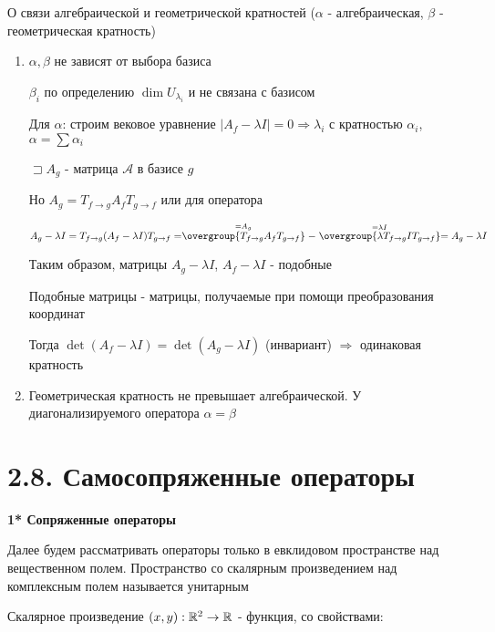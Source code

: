 \documentclass[12pt]{article}
\begin{document}
    \Nota О связи алгебраической и геометрической кратностей ($\alpha$ - алгебраическая, $\beta$ - геометрическая кратность)

    \begin{enumerate}
        \item $\alpha, \beta$ не зависят от выбора базиса

        \begin{MyProof}
            $\beta_i$ по определению $\dim U_{\lambda_i}$ и не связана с базисом

            Для $\alpha$: строим вековое уравнение $|A_f - \lambda I| = 0 \Longrightarrow \lambda_i$ с кратностью $\alpha_i$, $\alpha = \sum \alpha_i$

            $\sqsupset A_g$ - матрица $\mathcal{A}$ в базисе $g$

            Но $A_g = T_{f\to g} A_f T_{g\to f}$ или для оператора

            $A_g - \lambda I = T_{f\to g} (A_f - \lambda I) T_{g\to f} =
            \stackrel{= A_g}{\overgroup{T_{f\to g} A_f T_{g\to f}}} - \stackrel{= \lambda I}{\overgroup{\lambda T_{f\to g} I T_{g\to f}}} =
            A_g - \lambda I$

            Таким образом, матрицы $A_g - \lambda I$, $A_f - \lambda I$ - подобные

            \Def Подобные матрицы - матрицы, получаемые при помощи преобразования координат

            Тогда $\det (A_f - \lambda I) = \det (A_g - \lambda I)$ (инвариант) $\Longrightarrow$ одинаковая кратность

        \end{MyProof}

        \item Геометрическая кратность не превышает алгебраической. У диагонализируемого оператора $\alpha = \beta$
    \end{enumerate}

    \section[p2\_8]{2.8. Самосопряженные операторы}

    \textbf{1* Сопряженные операторы}

    Далее будем рассматривать операторы только в евклидовом пространстве над вещественном полем.
    Пространство со скалярным произведением над комплексным полем называется унитарным

    \Mem Скалярное произведение $(x, y) : \mathbb{R}^2 \rightarrow \mathbb{R}$ - функция, со свойствами:
\end{document}
